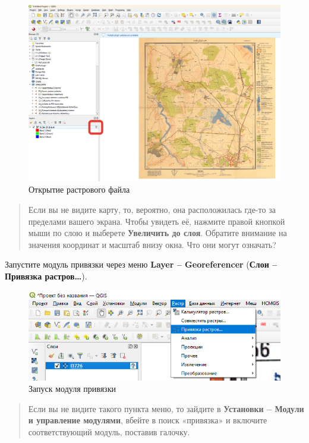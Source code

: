 \documentclass[
  12pt,
]{book}
\begin{document}
\begin{figure}
\centering
\includegraphics{images/Georeference/Unreferenced_Image.png}
\caption{Открытие растрового файла}
\end{figure}

\begin{quote}
Если вы не видите карту, то, вероятно, она расположилась где-то за пределами вашего экрана. Чтобы увидеть её, нажмите правой кнопкой мыши по слою и выберете \textbf{Увеличить до слоя}. Обратите внимание на значения координат и масштаб внизу окна. Что они могут означать?
\end{quote}

Запустите модуль привязки через меню \textbf{Layer -- Georeferencer} (\textbf{Слои -- Привязка растров\ldots{}}).

\begin{figure}
\centering
\includegraphics{images/Georeference/Georeference_raster.png}
\caption{Запуск модуля привязки}
\end{figure}

\begin{quote}
Если вы не видите такого пункта меню, то зайдите в \textbf{Установки -- Модули и управление модулями}, вбейте в поиск «привязка» и включите соответствующий модуль, поставив галочку.
\end{quote}
\end{document}
